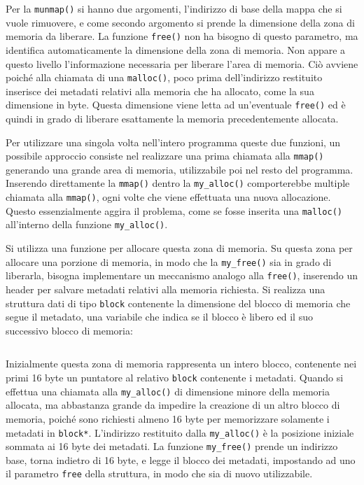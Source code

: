 \documentclass{article}
\numberwithin{equation}{subsection}
\begin{document}
Per la \verb|munmap()| si hanno due argomenti, l'indirizzo di base della mappa che si vuole 
rimuovere, e come secondo argomento si prende la dimensione della zona di memoria da liberare. La funzione \verb|free()| non ha bisogno di questo parametro, ma identifica automaticamente la 
dimensione della zona di memoria. Non appare a questo livello l'informazione necessaria per liberare l'area di memoria. 
Ciò avviene poiché alla chiamata di una \verb|malloc()|, poco prima dell'indirizzo restituito 
inserisce dei metadati relativi alla memoria che ha allocato, come la sua dimensione in byte. 
Questa dimensione viene letta ad un'eventuale \verb|free()| ed è quindi in grado di liberare 
esattamente la memoria precedentemente allocata. 

Per utilizzare una singola volta nell'intero programma queste due funzioni, un possibile approccio consiste nel realizzare una prima chiamata alla \verb|mmap()| generando una grande 
area di memoria, utilizzabile poi nel resto del programma. Inserendo direttamente la \verb|mmap()| dentro la \verb|my_alloc()| comporterebbe multiple chiamata alla \verb|mmap()|, ogni volte 
che viene effettuata una nuova allocazione. Questo essenzialmente aggira il problema, come se 
fosse inserita una \verb|malloc()| all'interno della funzione \verb|my_alloc()|. 


Si utilizza una funzione per allocare questa zona di memoria. Su questa zona per allocare 
una porzione di memoria, in modo che la \verb|my_free()| sia in grado di liberarla, bisogna 
implementare un meccanismo analogo alla \verb|free()|, inserendo un header per salvare metadati 
relativi alla memoria richiesta. Si realizza una struttura dati di tipo \verb|block| contenente la dimensione del blocco di memoria che segue il metadato, una variabile che 
indica se il blocco è libero ed il suo successivo blocco di memoria:
\inputminted[firstline=21,lastline=26]{c}{./"Esercitazione del 19-11-24"/domanda4.c}
Inizialmente questa zona di memoria rappresenta un intero blocco, contenente nei primi 16 byte un puntatore al relativo \verb|block| contenente i metadati. 
Quando si effettua una chiamata alla \verb|my_alloc()| di dimensione minore della memoria 
allocata, ma abbastanza grande da impedire la creazione di un altro blocco di memoria, poiché sono richiesti almeno 16 byte per memorizzare solamente i metadati in \verb|block*|. L'indirizzo restituito dalla \verb|my_alloc()| è la posizione iniziale sommata ai 16 byte dei metadati. 
La funzione \verb|my_free()| prende un indirizzo base, torna indietro di 16 byte, e legge il 
blocco dei metadati, impostando ad uno il parametro \verb|free| della struttura, in modo che sia 
di nuovo utilizzabile. 
\end{document}
